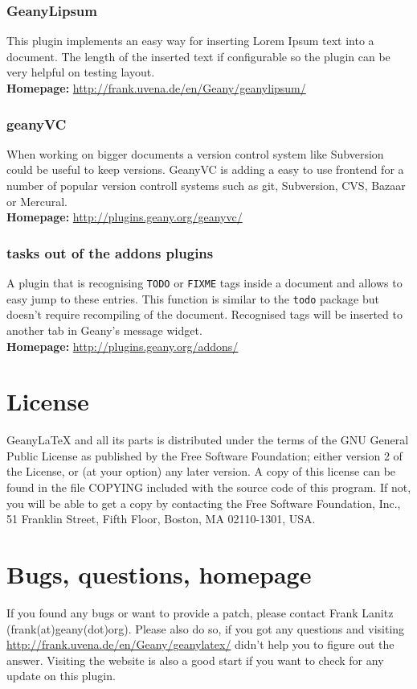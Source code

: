 \documentclass[%
a4paper,%
10pt,%
oneside,%
DIV18,
headsepline,
plainheadsepline,
footsepline,
plainfootsepline,
bibtotoc,%
liststotoc,%
BCOR12mm,%
halfparskip,%
openany,%
]{scrartcl}
\begin{document}
\subsubsection{GeanyLipsum}
This plugin implements an easy way for inserting Lorem Ipsum text into
a document. The length of the inserted text if configurable so the
plugin can be very helpful on testing layout.\\
\textbf{Homepage:} \url{http://frank.uvena.de/en/Geany/geanylipsum/}

\subsubsection{geanyVC}
When working on bigger documents a version control system like
Subversion could be useful to keep versions. GeanyVC is adding a easy
to use frontend for a number of popular version controll systems such
as git, Subversion, CVS, Bazaar or Mercural.\\
\textbf{Homepage:} \url{http://plugins.geany.org/geanyvc/}

\subsubsection{tasks out of the addons plugins}
A plugin that is recognising \texttt{TODO} or \texttt{FIXME} tags
inside a document and allows to easy jump to these entries. This
function is similar to the \texttt{todo} package but doesn't require
recompiling of the document. Recognised tags will be inserted to
another tab in Geany's message widget.\\
\textbf{Homepage:} \url{http://plugins.geany.org/addons/}

\section{License}
Geany\LaTeX{} and all its parts is distributed under the terms of the
GNU General Public License as published by the Free Software
Foundation; either version 2 of the License, or (at your option) any
later version. A copy of this license can be found in the file COPYING
included with the source code of this program. If not, you will be
able to get a copy by contacting the Free Software Foundation, Inc.,
51 Franklin Street, Fifth Floor, Boston, MA 02110-1301, USA.


\section{Bugs, questions, homepage}
\label{contact}
If you found any bugs or want to provide a patch, please contact Frank
Lanitz (frank(at)geany(dot)org). Please also do so, if you got any
questions and visiting \\ \url{http://frank.uvena.de/en/Geany/geanylatex/}
didn't help you to figure out the answer. Visiting the website is also
a good start if you want to check for any update on this plugin.
\end{document}
